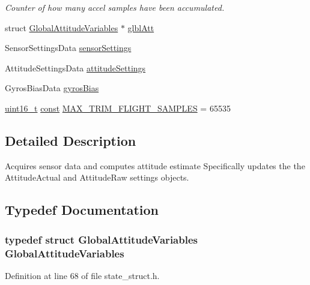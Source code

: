\begin{DoxyCompactItemize}
\begin{DoxyCompactList}\small\item\em Counter of how many accel samples have been accumulated. \end{DoxyCompactList}\item 
struct \hyperlink{struct_global_attitude_variables}{Global\-Attitude\-Variables} $\ast$ \hyperlink{group___state_ga76682d72011dc0109f1d5cf25a6c6da0}{glbl\-Att}
\item 
Sensor\-Settings\-Data \hyperlink{group___state_ga7e2b26cdc0322ab9457559aa2b94f8fc}{sensor\-Settings}
\item 
Attitude\-Settings\-Data \hyperlink{group___state_ga8f6543ab52bafea6c0858baeeae8db59}{attitude\-Settings}
\item 
Gyros\-Bias\-Data \hyperlink{group___state_ga233a2d6850e9c466f80ae6bb2ebd98e8}{gyros\-Bias}
\item 
\hyperlink{stdint_8h_a273cf69d639a59973b6019625df33e30}{uint16\-\_\-t} \hyperlink{group___n_a_m_e_ga7ae6d0e43244213b34de2c2b9aa30da6}{const} \hyperlink{group___state_ga6faaeb7ea10f4d232ea751bdcebb3aef}{M\-A\-X\-\_\-\-T\-R\-I\-M\-\_\-\-F\-L\-I\-G\-H\-T\-\_\-\-S\-A\-M\-P\-L\-E\-S} = 65535
\end{DoxyCompactItemize}


\subsection{Detailed Description}
Acquires sensor data and computes attitude estimate Specifically updates the the Attitude\-Actual and Attitude\-Raw settings objects. 

\subsection{Typedef Documentation}
\hypertarget{group___state_ga02f6c6dfdf0ff8ff2b30b24205c6b1f8}{
\subsubsection[{Global\-Attitude\-Variables}]{\setlength{\rightskip}{0pt plus 5cm}typedef struct {\bf Global\-Attitude\-Variables} {\bf Global\-Attitude\-Variables}}}\label{group___state_ga02f6c6dfdf0ff8ff2b30b24205c6b1f8}


Definition at line 68 of file state\-\_\-struct.\-h.



